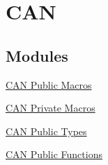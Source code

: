 \hypertarget{group___c_a_n}{\section{\-C\-A\-N}
\label{group___c_a_n}
}
\subsection*{\-Modules}
\begin{DoxyCompactItemize}
\item 
\hyperlink{group___c_a_n___public___macros}{\-C\-A\-N Public Macros}
\item 
\hyperlink{group___c_a_n___private___macros}{\-C\-A\-N Private Macros}
\item 
\hyperlink{group___c_a_n___public___types}{\-C\-A\-N Public Types}
\item 
\hyperlink{group___c_a_n___public___functions}{\-C\-A\-N Public Functions}
\end{DoxyCompactItemize}
